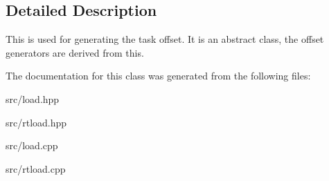 \subsection{Detailed Description}
This is used for generating the task offset. It is an abstract class, the offset generators are derived from this. 

The documentation for this class was generated from the following files\+:\begin{DoxyCompactItemize}
\item 
src/load.\+hpp\item 
src/rtload.\+hpp\item 
src/load.\+cpp\item 
src/rtload.\+cpp\end{DoxyCompactItemize}
